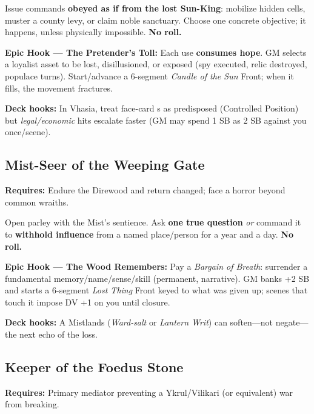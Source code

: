 \begin{tcolorbox}[enhanced,sharp corners,boxrule=.6pt,title={Talent — The Sunburst Warrant (18 XP, 1/campaign)}]
Issue commands \textbf{obeyed as if from the lost Sun-King}: mobilize hidden cells, muster a county levy, or claim noble sanctuary. Choose one concrete objective; it happens, unless physically impossible. \textbf{No roll.}
\end{tcolorbox}

\textbf{Epic Hook — The Pretender's Toll:} Each use \textbf{consumes hope}. GM selects a loyalist asset to be lost, disillusioned, or exposed (spy executed, relic destroyed, populace turns). Start/advance a 6-segment \emph{Candle of the Sun} Front; when it fills, the movement fractures.

\textbf{Deck hooks:} In Vhasia, treat face-card \SuitHeart{}s as predisposed (Controlled Position) but \SuitClub{} \emph{legal/economic} hits escalate faster (GM may spend 1 SB as 2 SB against you once/scene).

\subsection{Mist-Seer of the Weeping Gate}
\textbf{Requires:} Endure the Direwood and return changed; face a horror beyond common wraiths.

\begin{tcolorbox}[enhanced,sharp corners,boxrule=.6pt,title={Talent — Bargain with the Deep Mist (20 XP, 1/campaign)}]
Open parley with the Mist's sentience. Ask \textbf{one true question} \emph{or} command it to \textbf{withhold influence} from a named place/person for a year and a day. \textbf{No roll.}
\end{tcolorbox}

\textbf{Epic Hook — The Wood Remembers:} Pay a \emph{Bargain of Breath}: surrender a fundamental memory/name/sense/skill (permanent, narrative). GM banks +2 SB and starts a 6-segment \emph{Lost Thing} Front keyed to what was given up; scenes that touch it impose DV +1 on you until closure.

\textbf{Deck hooks:} A Mistlands \SuitDiamond{} (\emph{Ward-salt} or \emph{Lantern Writ}) can soften—not negate—the next echo of the loss.

\subsection{Keeper of the Foedus Stone}
\textbf{Requires:} Primary mediator preventing a Ykrul/Vilikari (or equivalent) war from breaking.

